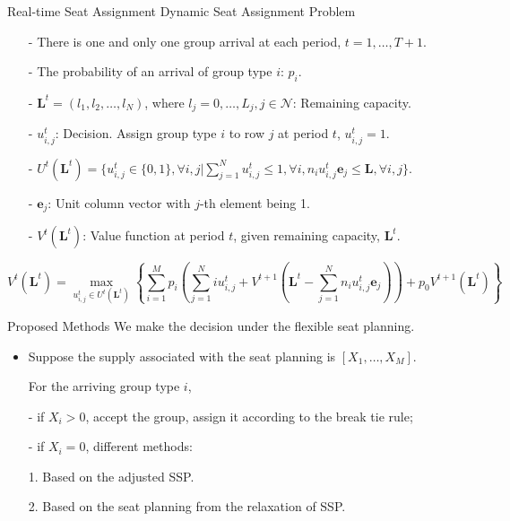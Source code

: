   \begin{frame}{Real-time Seat Assignment}
    \centering
    Dynamic Seat Assignment Problem
    \small
    \begin{itemize}
    \item[-] There is one and only one group arrival at each period, $t = 1, \ldots, T+1$. 
    \item[-] The probability of an arrival of group type $i$: $p_i$.
    \item[-] $\mathbf{L}^{t} = (l_1, l_2, \ldots, l_{N})$, where $l_j =0,\ldots, L_j, j\in \mathcal{N}$: Remaining capacity.
    \item[-] $u_{i,j}^{t}$: Decision. Assign group type $i$ to row $j$ at period $t$, $u_{i,j}^t =1$.
    \item[-] $U^{t}(\mathbf{L}^{t}) = \{u_{i,j}^{t} \in\{0,1\}, \forall i,j| \sum_{j=1}^{N} u_{i,j}^{t} \leq 1, \forall i, n_{i}u_{i,j}^{t}\mathbf{e}_j \leq \mathbf{L}, \forall i,j \}$.
    \item[-] $\mathbf{e}_j$: Unit column vector with $j$-th element being 1.
    \item[-] $V^{t}(\mathbf{L}^{t})$: Value function at period $t$, given remaining capacity, $\mathbf{L}^{t}$.
    \end{itemize}

    $$V^{t}(\mathbf{L}^{t}) = \max_{u_{i,j}^{t} \in U^{t}(\mathbf{L}^{t})}\left\{ \sum_{i=1}^{M} p_i ( \sum_{j=1}^{N} i u_{i,j}^{t} + V^{t+1}(\mathbf{L}^{t}- \sum_{j=1}^{N} n_i u_{i,j}^{t}\mathbf{e}_j)) + p_0 V^{t+1}(\mathbf{L}^{t})\right\}$$
    \small
\end{frame}

  \begin{frame}{Proposed Methods}
    We make the decision under the flexible seat planning.

    \begin{itemize}
      \item Suppose the supply associated with the seat planning is $[X_{1}, \ldots, X_M]$.
      
      \vspace{0.5cm}

      For the arriving group type $i$,

      \item[-] if $X_i > 0$, accept the group, assign it according to the break tie rule;
      
      \item[-] if $X_i = 0$, different methods:
      
      \vspace{0.5cm}

      1. Based on the adjusted SSP.

      2. Based on the seat planning from the relaxation of SSP.

    \end{itemize}
  \end{frame}

